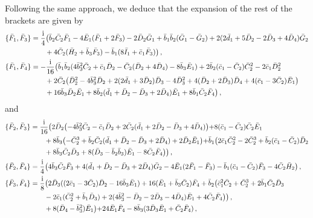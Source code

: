 \documentclass[10pt]{amsart}
\theoremstyle{definition}
\theoremstyle{corollary}
\theoremstyle{remark}
\theoremstyle{conclusion}
\begin{document}
Following the same approach, we deduce that the expansion of the rest of the brackets are given by 
\begin{align}
\{\bar{F}_1, \bar{F}_3\}&=\frac{{\rm i}}{4}\bigl( \bar{b}_2 \bar{C}_2 \bar{F}_1-4\bar{E}_1(\bar{F}_1+2\bar{F}_3)-2\bar{D}_2 \bar{G}_1+\bar{b}_1 \bar{b}_2(\bar{G}_1-\bar{G}_2)+2(2\bar{d}_1+5 \bar{D}_2-2\bar{D}_3+4\bar{D}_4)\bar{G}_2\nonumber \\
& \hskip 0.7 cm +4 \bar{C}_2(\bar{H}_2+\bar{b}_3 \bar{F}_3)-\bar{b}_1(8\bar{I}_1+\bar{c}_1\bar{F}_3)   \bigl) \, ,\nonumber \\
\{\bar{F}_1, \bar{F}_4\}&=-\frac{{\rm i}}{16}\bigl(\bar{b}_1 \bar{b}_2(4\bar{b}_3^2\bar{C}_2+\bar{c}_1 \bar{D}_2-\bar{C}_2(\bar{D}_2+4\bar{D}_4)-8\bar{b}_3 \bar{E}_1) +2\bar{b}_2(\bar{c}_1-\bar{C}_2)\bar{C}_2^2-2\bar{c}_1\bar{D}_2^2 \nonumber\\
 & \hskip 0.7 cm +2 \bar{C}_2 \bigl( \bar{D}_2^2-4\bar{b}_3^2 \bar{D}_2+2(2\bar{d}_1+3\bar{D}_2)\bar{D}_3-4\bar{D}_3^2+4(\bar{D}_2+2\bar{D}_3)\bar{D}_4+4(\bar{c}_1-3\bar{C}_2)\bar{E}_1\bigl) \nonumber\\
 & \hskip 0.7 cm +16 \bar{b}_3\bar{D}_2\bar{E}_1+8\bar{b}_2(\bar{d}_1+\bar{D}_2-\bar{D}_3+2\bar{D}_4)\bar{E}_1+8\bar{b}_1 \bar{C}_2 \bar{F}_4\bigl) \, , \nonumber
 \end{align} and 
 \begin{align} 
\{\bar{F}_2, \bar{F}_3\}&=\frac{{\rm i}}{16}\bigl( 2 \bar{D}_2\bigl(-4 \bar{b}_3^2 \bar{C}_2-\bar{c}_1 \bar{D}_2+2\bar{C}_2(\bar{d}_1+2\bar{D}_2-\bar{D}_3+4 \bar{D}_4)\bigl)+8(\bar{c}_1-\bar{C}_2)\bar{C}_2\bar{E}_1 \nonumber \\
 & \hskip 0.7 cm +8 \bar{b}_3\bigl( -\bar{C}_2^3+\bar{b}_2 \bar{C}_2(\bar{d}_1+\bar{D}_2-\bar{D}_3+2\bar{D}_4)+2\bar{D}_2 \bar{E}_1\bigl)+\bar{b}_1 \bigl(2 \bar{c}_1 \bar{C}_2^2-2\bar{C}_2^3+\bar{b}_2(\bar{c}_1-\bar{C}_2)\bar{D}_2 \nonumber\\
 & \hskip 0.7 cm +8 \bar{b}_3 \bar{C}_2 \bar{D}_3+8(\bar{D}_3-\bar{b}_2 \bar{b}_3)\bar{E}_1-8\bar{C}_2 \bar{F}_4   \bigl)\bigl) \, ,\nonumber\\
\{\bar{F}_2, \bar{F}_4\}&=\frac{{\rm i}}{4}\bigl( 4 \bar{b}_3 \bar{C}_2 \bar{F}_3+4(\bar{d}_1+\bar{D}_2-\bar{D}_3+2\bar{D}_4)\bar{G}_2-4 \bar{E}_1(2\bar{F}_1-\bar{F}_3)-\bar{b}_1(\bar{c}_1-\bar{C}_2)\bar{F}_3-4\bar{C}_2 \bar{H}_2\bigl) \, ,\nonumber\\
\{\bar{F}_3, \bar{F}_4\}&=\frac{{\rm i}}{8}\bigl( 2 \bar{D}_3((2\bar{c}_1-3\bar{C}_2)\bar{D}_2-16 \bar{b}_3 \bar{E}_1)+16 (\bar{E}_1+\bar{b}_3 \bar{C}_2)\bar{F}_4+\bar{b}_2\bigl(\bar{c}_1^2 \bar{C}_2+\bar{C}_2^3+2\bar{b}_1\bar{C}_2\bar{D}_3\nonumber\\
 & \hskip 0.7 cm -2 \bar{c}_1(\bar{C}_2^2+\bar{b}_1\bar{D}_3)+2(4\bar{b}_3^2-\bar{D}_2-2\bar{D}_3-4\bar{D}_4)\bar{E}_1+4\bar{C}_2 \bar{F}_4 \bigl)\bigl) \, ,\nonumber\\
 & \hskip 0.7 cm+8(\bar{D}_4-\bar{b}_3^2)\bar{E}_1\bigl)+24 \bar{E}_1 \bar{F}_4-8 \bar{b}_3(3 \bar{D}_3\bar{E}_1+\bar{C}_2\bar{F}_4) \, ,%
 \end{align} 
\end{document}
